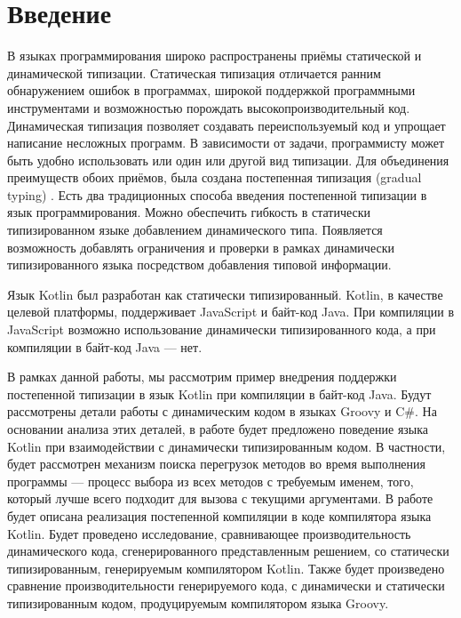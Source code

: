 \section*{Введение}

В языках программирования широко распространены приёмы статической и динамической типизации. Статическая типизация отличается ранним обнаружением ошибок в программах, широкой поддержкой программными инструментами и возможностью порождать высокопроизводительный код. Динамическая типизация позволяет создавать переиспользуемый код и упрощает написание несложных программ. 
В зависимости от задачи, программисту может быть удобно использовать или один или другой вид типизации. Для объединения преимуществ обоих приёмов, была создана постепенная типизация (gradual typing) \cite{gradual:siek2006gradual}. Есть два традиционных способа введения постепенной типизации в язык программирования. Можно обеспечить гибкость в статически типизированном языке добавлением динамического типа. Появляется возможность добавлять ограничения и проверки в рамках динамически типизированного языка посредством добавления типовой информации.

Язык Kotlin был разработан как статически типизированный.
Kotlin, в качестве целевой платформы, поддерживает JavaScript и байт-код Java. При компиляции в JavaScript возможно использование динамически типизированного кода, а при компиляции в байт-код Java --- нет.

В рамках данной работы, мы рассмотрим пример внедрения поддержки постепенной типизации в язык Kotlin при компиляции в байт-код Java. Будут рассмотрены детали работы с динамическим кодом в языках Groovy и C\#. На основании анализа этих деталей, в работе будет предложено поведение языка Kotlin при взаимодействии с динамически типизированным кодом. В частности, будет рассмотрен механизм поиска перегрузок методов во время выполнения программы --- процесс выбора из всех методов с требуемым именем, того, который лучше всего подходит для вызова с текущими аргументами. В работе будет описана реализация постепенной компиляции в коде компилятора языка Kotlin. Будет проведено исследование, сравнивающее производительность динамического кода, сгенерированного представленным решением, со статически типизированным, генерируемым компилятором Kotlin. Также будет произведено сравнение производительности генерируемого кода, с динамически и статически типизированным кодом, продуцируемым компилятором языка Groovy. 



